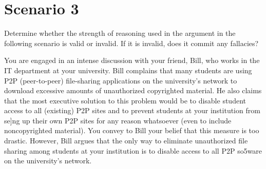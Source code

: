\documentclass{article}
\begin{document}
\section{Scenario 3}

Determine whether the strength of reasoning used in the argument in the following scenario is valid or invalid.
If it is invalid, does it commit any fallacies?

\medskip

You are engaged in an intense discussion with your friend, Bill, who works in the IT department at your university.
Bill complains that many students are using P2P (peer-to-peer) file-sharing applications on the university’s network to download excessive amounts of unauthorized copyrighted material.
He also claims that the most executive solution to this problem would be to disable student access to all (existing) P2P sites and to prevent students at your institution from se]ng up their own P2P sites for any reason whatsoever (even to include noncopyrighted material).
You convey to Bill your belief that this measure is too drastic.
However, Bill argues that the only way to eliminate unauthorized file sharing among students at your institution is to disable access to all P2P so5ware on the university’s network.  
\end{document}
